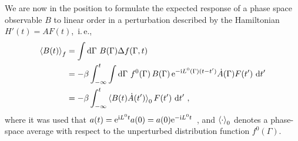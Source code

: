 We are now in the position to formulate the expected response of a phase space observable $B$ to linear order in a perturbation described by the Hamiltonian $H'(t) = A F(t)$,~i.\,e.,~
\begin{align}
\braket{B (t)}_f
    &= \int {\rm d} \Gamma ~  B (\Gamma) \Delta f (\Gamma, t) \\
    &= - \beta \int_{-\infty}^t 
      \int {\rm d} \Gamma ~ f^0(\Gamma) \, 
       B (\Gamma) \, {\rm e}^{-{\rm i} L^0 (\Gamma) (t - t')} \dot{A}(\Gamma) F(t') ~ {\rm d} t' \\
    &= - \beta \int_{-\infty}^t 
      \braket{B(t) \dot{A}(t')}_0 F(t') ~ {\rm d} t'~,
  \label{eq:lr.dB}
\end{align}
where it was used that $a(t) = {\rm e}^{{\rm i} L^0 t} a(0) = a(0) {\rm e}^{-{\rm i} L^0 t}$~\cite[p.\,498]{Tuckerman}, and $\braket{\cdot}_0$ denotes a phase-space average with respect to the unperturbed distribution function $f^0 (\Gamma)$.

